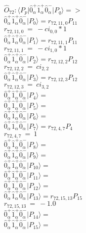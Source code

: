 \documentclass[14pt]{article}
\begin{document}
    $\hat{O}_{72}:  \langle{P_p}\vert \hat{0}_{\alpha}^{+}\hat{1}_{\alpha}^{+}\hat{0}_{\alpha}^{-} \vert{P_q}\rangle => $ \\ 
    $ \hat{0}_{\alpha}^{+}\hat{1}_{\alpha}^{+}\hat{0}_{\alpha}^{-} \vert{P_{0}}\rangle = {r}_{72,11,0}P_{11} $ \\ 
    ${r}_{72,11,0}\ =\ -{ci}_{0,0}*1 $ \\ 
    $ \hat{0}_{\alpha}^{+}\hat{1}_{\alpha}^{+}\hat{0}_{\alpha}^{-} \vert{P_{1}}\rangle = {r}_{72,11,1}P_{11} $ \\ 
    ${r}_{72,11,1}\ =\ -{ci}_{1,0}*1 $ \\ 
    $ \hat{0}_{\alpha}^{+}\hat{1}_{\alpha}^{+}\hat{0}_{\alpha}^{-} \vert{P_{2}}\rangle = {r}_{72,12,2}P_{12} $ \\ 
    ${r}_{72,12,2}\ =\ {ci}_{2,2} $ \\ 
    $ \hat{0}_{\alpha}^{+}\hat{1}_{\alpha}^{+}\hat{0}_{\alpha}^{-} \vert{P_{3}}\rangle = {r}_{72,12,3}P_{12} $ \\ 
    ${r}_{72,12,3}\ =\ {ci}_{3,2} $ \\ 
    $ \hat{0}_{\alpha}^{+}\hat{1}_{\alpha}^{+}\hat{0}_{\alpha}^{-} \vert{P_{4}}\rangle =  $ \\ 
    $ \hat{0}_{\alpha}^{+}\hat{1}_{\alpha}^{+}\hat{0}_{\alpha}^{-} \vert{P_{5}}\rangle =  $ \\ 
    $ \hat{0}_{\alpha}^{+}\hat{1}_{\alpha}^{+}\hat{0}_{\alpha}^{-} \vert{P_{6}}\rangle =  $ \\ 
    $ \hat{0}_{\alpha}^{+}\hat{1}_{\alpha}^{+}\hat{0}_{\alpha}^{-} \vert{P_{7}}\rangle = {r}_{72,4,7}P_{4} $ \\ 
    ${r}_{72,4,7}\ =\ 1 $ \\ 
    $ \hat{0}_{\alpha}^{+}\hat{1}_{\alpha}^{+}\hat{0}_{\alpha}^{-} \vert{P_{8}}\rangle =  $ \\ 
    $ \hat{0}_{\alpha}^{+}\hat{1}_{\alpha}^{+}\hat{0}_{\alpha}^{-} \vert{P_{9}}\rangle =  $ \\ 
    $ \hat{0}_{\alpha}^{+}\hat{1}_{\alpha}^{+}\hat{0}_{\alpha}^{-} \vert{P_{10}}\rangle =  $ \\ 
    $ \hat{0}_{\alpha}^{+}\hat{1}_{\alpha}^{+}\hat{0}_{\alpha}^{-} \vert{P_{11}}\rangle =  $ \\ 
    $ \hat{0}_{\alpha}^{+}\hat{1}_{\alpha}^{+}\hat{0}_{\alpha}^{-} \vert{P_{12}}\rangle =  $ \\ 
    $ \hat{0}_{\alpha}^{+}\hat{1}_{\alpha}^{+}\hat{0}_{\alpha}^{-} \vert{P_{13}}\rangle = {r}_{72,15,13}P_{15} $ \\ 
    ${r}_{72,15,13}\ =\ -1.0 $ \\ 
    $ \hat{0}_{\alpha}^{+}\hat{1}_{\alpha}^{+}\hat{0}_{\alpha}^{-} \vert{P_{14}}\rangle =  $ \\ 
    $ \hat{0}_{\alpha}^{+}\hat{1}_{\alpha}^{+}\hat{0}_{\alpha}^{-} \vert{P_{15}}\rangle =  $ \\ 
    
\end{document}
